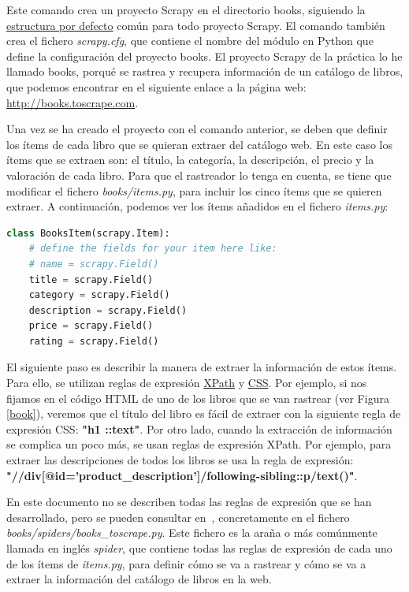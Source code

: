 \documentclass{uimppracticas}
\begin{document}
Este comando crea un proyecto Scrapy en el directorio books, siguiendo la \href{https://docs.scrapy.org/en/latest/topics/commands.html#default-structure-of-scrapy-projects}{estructura por defecto} común para todo proyecto Scrapy. El comando también crea el fichero \textit{scrapy.cfg}, que contiene el nombre del módulo en Python que define la configuración del proyecto books. El proyecto Scrapy de la práctica lo he llamado books, porqué se rastrea y recupera información de un catálogo de libros, que podemos encontrar en el siguiente enlace a la página web: \url{http://books.toscrape.com}.

Una vez se ha creado el proyecto con el comando anterior, se deben que definir los ítems de cada libro que se quieran extraer del catálogo web. En este caso los ítems que se extraen son: el título, la categoría, la descripción, el precio y la valoración de cada libro. Para que el rastreador lo tenga en cuenta, se tiene que modificar el fichero \textit{books/items.py}, para incluir los cinco ítems que se quieren extraer. A continuación, podemos ver los ítems añadidos en el fichero \textit{items.py}:

\begin{lstlisting}[language=python]
class BooksItem(scrapy.Item):
	# define the fields for your item here like:
	# name = scrapy.Field()
	title = scrapy.Field()
	category = scrapy.Field()
	description = scrapy.Field()
	price = scrapy.Field()
	rating = scrapy.Field()
\end{lstlisting}

El siguiente paso es describir la manera de extraer la información de estos ítems. Para ello, se utilizan reglas de expresión \href{https://www.w3.org/TR/xpath/all/}{XPath} y \href{https://www.w3.org/TR/selectors/}{CSS}. Por ejemplo, si nos fijamos en el código HTML de uno de los libros que se van rastrear (ver Figura \ref{book}), veremos que el título del libro es fácil de extraer con la siguiente regla de expresión CSS: \textbf{"h1 ::text"}. Por otro lado, cuando la extracción de información se complica un poco más, se usan reglas de expresión XPath. Por ejemplo, para extraer las descripciones de todos los libros se usa la regla de expresión: \textbf{"//div[@id='product\_description']/following-sibling::p/text()"}. 

En este documento no se describen todas las reglas de expresión que se han desarrollado, pero se pueden consultar en~\cite{GitHubRepo}, concretamente en el fichero \textit{books/spiders/books\_toscrape.py}. Este fichero es la araña o más comúnmente llamada en inglés \textit{spider}, que contiene todas las reglas de expresión de cada uno de los ítems de \textit{items.py}, para definir cómo se va a rastrear y cómo se va a extraer la información del catálogo de libros en la web.
\end{document}
